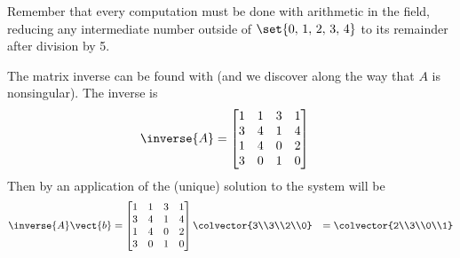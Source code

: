Remember that every computation must be done with arithmetic in the field, reducing any intermediate number outside of $\set{0,\,1,\,2,\,3,\,4}$ to its remainder after division by 5.\par
%
The matrix inverse can be found with  (and we discover along the way that $A$ is nonsingular).  The inverse is
%
\begin{align*}
\inverse{A}&=
\begin{bmatrix}
 1 & 1 & 3 & 1 \\
 3 & 4 & 1 & 4 \\
 1 & 4 & 0 & 2 \\
 3 & 0 & 1 & 0
\end{bmatrix}
\end{align*}
%
Then by an application of  the (unique) solution to the system will be
%
\begin{align*}
\inverse{A}\vect{b}
&=
\begin{bmatrix}
 1 & 1 & 3 & 1 \\
 3 & 4 & 1 & 4 \\
 1 & 4 & 0 & 2 \\
 3 & 0 & 1 & 0
\end{bmatrix}
\colvector{3\\3\\2\\0}
&=
\colvector{2\\3\\0\\1}
\end{align*}
%
